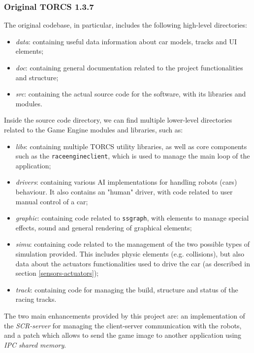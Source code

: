 \subsubsection{Original TORCS 1.3.7}
The original codebase, in particular, includes the following high-level directories:
\begin{itemize}
	\item \textit{data}: containing useful data information about car models, tracks and UI elements;
	\item \textit{doc}: containing general documentation related to the project functionalities and structure;
	\item \textit{src}: containing the actual source code for the software, with its libraries and modules.
\end{itemize}
Inside the source code directory, we can find multiple lower-level directories related to the Game Engine modules and libraries, such as:
\begin{itemize}
	\item \textit{libs}: containing multiple TORCS utility libraries, as well as core components such as the \texttt{raceengineclient}, which is used to manage the main loop of the application;
	\item \textit{drivers}: containing various AI implementations for handling robots (cars) behaviour. It also contains an "human" driver, with code related to user manual control of a car;
	\item \textit{graphic}: containing code related to \texttt{ssgraph}, with elements to manage special effects, sound and general rendering of graphical elements;
	\item \textit{simu}: containing code related to the management of the two possible types of simulation provided. This includes physic elements (e.g. collisions), but also data about the actuators functionalities used to drive the car (as described in section \ref{sensors-actuators});
	\item \textit{track}: containing code for managing the build, structure and status of the racing tracks. 
\end{itemize}
The two main enhancements provided by this project are: an implementation of the \textit{SCR-server} for managing the client-server communication with the robots, and a patch which allows to send the game image to another application using \textit{IPC shared memory}.


